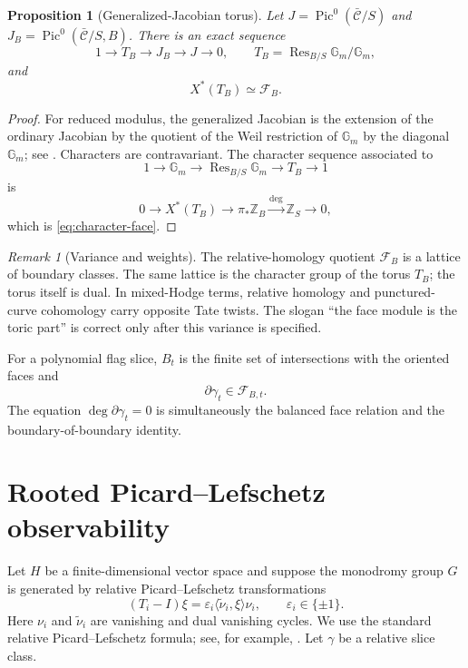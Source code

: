 \documentclass[11pt]{article}
\numberwithin{equation}{section}
\newtheorem{proposition}[proposition]{Proposition}
\theoremstyle{definition}
\theoremstyle{remark}
\newtheorem{remark}[remark]{Remark}
\newcommand{\Z}{\mathbb Z}
\newcommand{\Gm}{\mathbb G_m}
\newcommand{\Pic}{\operatorname{Pic}}
\newcommand{\Res}{\operatorname{Res}}
\newcommand{\Fcal}{\mathcal F}
\begin{document}
\begin{proposition}[Generalized-Jacobian torus]\label{prop:gen-Jac}
Let $J=\Pic^0(\bar{\mathcal C}/S)$ and
$J_B=\Pic^0(\bar{\mathcal C}/S,B)$.  There is an exact sequence
\begin{equation}\label{eq:gen-Jac-seq}
  1\longrightarrow T_B\longrightarrow J_B\longrightarrow J\longrightarrow0,
  \qquad
  T_B=\Res_{B/S}\Gm/\Gm,
\end{equation}
and
\begin{equation}\label{eq:character-face}
  X^*(T_B)\simeq\Fcal_B.
\end{equation}
\end{proposition}

\begin{proof}
For reduced modulus, the generalized Jacobian is the extension of the ordinary
Jacobian by the quotient of the Weil restriction of $\Gm$ by the diagonal
$\Gm$; see \cite[Chapter~V]{SerreAGCF}.  Characters are contravariant.  The
character sequence associated to
\[
  1\to\Gm\to\Res_{B/S}\Gm\to T_B\to1
\]
is
\[
  0\to X^*(T_B)\to\pi_*\Z_B\xrightarrow{\deg}\Z_S\to0,
\]
which is \eqref{eq:character-face}.
\end{proof}

\begin{remark}[Variance and weights]\label{rem:variance}
The relative-homology quotient $\Fcal_B$ is a lattice of boundary classes.
The same lattice is the character group of the torus $T_B$; the torus itself
is dual.  In mixed-Hodge terms, relative homology and punctured-curve
cohomology carry opposite Tate twists.  The slogan ``the face module is the
toric part'' is correct only after this variance is specified.
\end{remark}

For a polynomial flag slice, $B_t$ is the finite set of intersections with
the oriented faces and
\[
  \partial\gamma_t\in\Fcal_{B,t}.
\]
The equation $\deg\partial\gamma_t=0$ is simultaneously the balanced face
relation and the boundary-of-boundary identity.

\section{Rooted Picard--Lefschetz observability}\label{sec:PL}

Let $H$ be a finite-dimensional vector space and suppose the monodromy group
$G$ is generated by relative Picard--Lefschetz transformations
\begin{equation}\label{eq:relative-PL}
  (T_i-I)\xi
  =\varepsilon_i\langle\widetilde\nu_i,\xi\rangle\nu_i,
  \qquad \varepsilon_i\in\{\pm1\}.
\end{equation}
Here $\nu_i$ and $\widetilde\nu_i$ are vanishing and dual vanishing cycles.
We use the standard relative Picard--Lefschetz formula; see, for example,
\cite[Chapters~2--3]{DimcaSingularities}.
Let $\gamma$ be a relative slice class.
\end{document}
